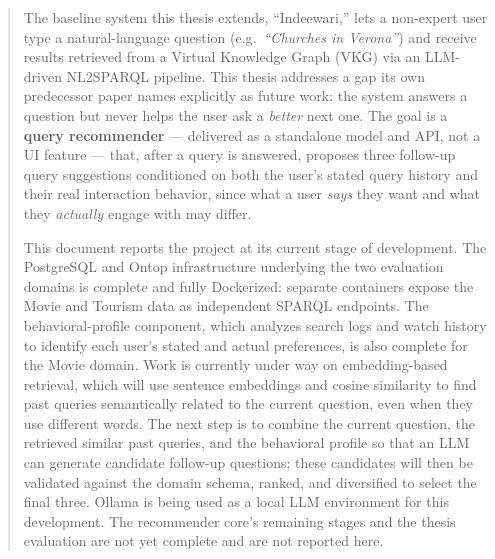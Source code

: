 \documentclass[a4paper,11pt]{report}
\newenvironment{poliabstract}[1]
  {\renewcommand{\abstractname}{#1}\begin{abstract}}
  {\end{abstract}}
\begin{document}
\newpage\null\thispagestyle{empty}\newpage

\begin{poliabstract}{Abstract}

The baseline system this thesis extends, ``Indeewari,'' lets a non-expert user type a
natural-language question (e.g.\ \emph{``Churches in Verona''}) and receive results retrieved from
a Virtual Knowledge Graph (VKG) via an LLM-driven NL2SPARQL pipeline. This thesis addresses a gap
its own predecessor paper names explicitly as future work: the system answers a question but never
helps the user ask a \emph{better} next one. The goal is a \textbf{query recommender} ---
delivered as a standalone model and API, not a UI feature --- that, after a query is answered,
proposes three follow-up query suggestions conditioned on both the user's stated query history and
their real interaction behavior, since what a user \emph{says} they want and what they
\emph{actually} engage with may differ.

This document reports the project at its current stage of development. The PostgreSQL and Ontop
infrastructure underlying the two evaluation domains is complete and fully Dockerized: separate
containers expose the Movie and Tourism data as independent SPARQL endpoints. The
behavioral-profile component, which analyzes search logs and watch history to identify each user's
stated and actual preferences, is also complete for the Movie domain. Work is currently under way
on embedding-based retrieval, which will use sentence embeddings and cosine similarity to find past
queries semantically related to the current question, even when they use different words. The
next step is to combine the current question, the retrieved similar past queries, and the
behavioral profile so that an LLM can generate candidate follow-up questions; these candidates
will then be validated against the domain schema, ranked, and diversified to select the final
three. Ollama is being used as a local LLM environment for this development. The recommender
core's remaining stages and the thesis evaluation are not yet complete and are not reported here.

\end{poliabstract}

\newpage\null\thispagestyle{empty}\newpage
\end{document}
